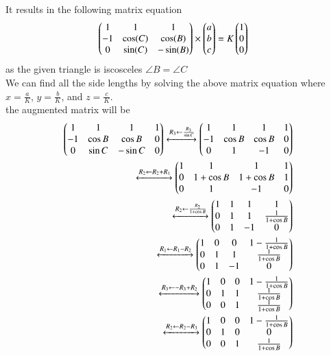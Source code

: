 \documentclass[journal]{IEEEtran}
\begin{document}
It results in the following matrix equation
\begin{align*}
  \begin{pmatrix}1 & 1 & 1\\-1 & \cos(C) & \cos(B)\\0 & \sin(C) & -\sin(B)\end{pmatrix}\times\begin{pmatrix}a\\b\\c\end{pmatrix}&=K\begin{pmatrix}1\\0\\0\end{pmatrix}
\end{align*}
as the given triangle is iscosceles $\angle B = \angle C$\\
We can find all the side lengths by solving the above matrix equation where $x=\frac{a}{K}$, $y=\frac{b}{K}$, and $z=\frac{c}{K}$.\\
the augmented matrix will be\\
\begin{align*}
	\begin{pmatrix}1 & 1 & 1 & 1\\ -1 & \cos B & \cos B & 0\\ 0 & \sin C & -\sin C & 0\end{pmatrix}\xleftrightarrow[]{R_3 \leftarrow {\frac{R_3}{\sin C}}}\begin{pmatrix}1 & 1 & 1 & 1\\ -1 & \cos B & \cos B & 0\\ 0 & 1 & -1 & 0\end{pmatrix}\\
	\xleftrightarrow[]{R_2 \leftarrow {R_2+R_1}} \begin{pmatrix}1 & 1 & 1 & 1\\ 0 & 1 + \cos B & 1 + \cos B & 1\\ 0 & 1 & -1 & 0\end{pmatrix}\\
	\xleftrightarrow[]{R_2 \leftarrow {\frac{R_2}{1 + \cos B}}}\begin{pmatrix}1 & 1 & 1 & 1\\ 0 & 1 & 1 & \frac{1}{1 + \cos B}\\ 0 & 1 & -1 & 0\end{pmatrix}\\
	\xleftrightarrow[]{R_1 \leftarrow {R_1-R_2}}\begin{pmatrix}1 & 0 & 0 & 1 - \frac{1}{1 + \cos B}\\ 0 & 1 & 1 & \frac{1}{1 + \cos B}\\0 & 1 & -1 & 0\end{pmatrix}\\
	\xleftrightarrow[]{R_3 \leftarrow {-R_3+R_2}}\begin{pmatrix}1 & 0 & 0 & 1 - \frac{1}{1 + \cos B}\\ 0 & 1 & 1 & \frac{1}{1 + \cos B}\\ 0 & 0 & 1 & \frac{1}{1 + \cos B}\end{pmatrix}\\
	\xleftrightarrow[]{R_2 \leftarrow {R_2-R_3}}\begin{pmatrix}1 & 0 & 0 & 1 - \frac{1}{1+\cos B}\\ 0 & 1 & 0 & 0\\ 0 & 0 & 1 & \frac{1}{1 + \cos B}\end{pmatrix}
\end{align*}
\end{document}
